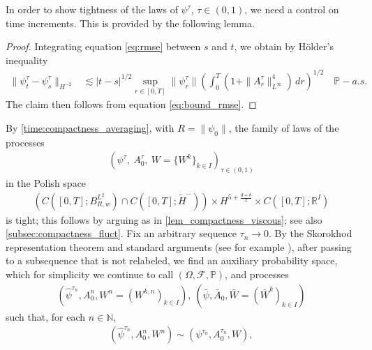 \documentclass[a4paper,10pt]{amsart}
\newcommand{\N}{\mathbb{N}}
\newtheorem{lemma}[theorem]{Lemma}
\theoremstyle{remark}
\numberwithin{equation}{section}
\begin{document}
In order to show tightness of the laws of $\psi^{\tau}$, $\tau\in (0,1)$, we need a control on time increments. This is provided by the following lemma.
\begin{proof}
    Integrating equation \eqref{eq:rmse} between $s$ and $t$, we obtain by
    H\"older's inequality
    \begin{align*}
        \|\psi^{\tau}_t-\psi^{\tau}_s\|_{H^{-2}}
        &\lesssim |t-s|^{1/2}
        \sup_{r\in[0,T]}\|\psi^{\tau}_r\|\left(\int_0^T
        (1+\|A^{\tau}_r\|^4_{L^\infty})\,dr\right)^{1/2}
        \quad\mathbb{P}-a.s.
    \end{align*}
    The claim then follows from equation \eqref{eq:bound_rmse}.
\end{proof}
By \cref{time:compactness_averaging}, with $R=\|\psi_0\|$, the family of
laws of the processes
\begin{align*}
    \left(\psi^{\tau},\ A_0^\tau,\ W=\{W^k\}_{k\in I}\right)_{\tau\in (0,1)}
\end{align*}
in the Polish space
\begin{align*}
\left(C([0,T];B^{L^2}_{R,w})\cap C([0,T];\tilde{H}^-)\right)
\times H^{5+\frac{d+\theta}{2}}\times C([0,T];\mathbb{R}^I)
\end{align*}
is tight; this follows by arguing as in \cref{lem_compactness_viscous}; see
also
\cref{subsec:compactness_fluct}. Fix an arbitrary sequence
$\tau_n\rightarrow0$. By the Skorokhod representation theorem and standard
arguments (see for example \cite[Chapter 2]{flandoli2023stochastic}), after
passing to a subsequence that is not relabeled, we find an auxiliary
probability space, which for simplicity we continue to call
$(\Omega,\mathcal{F},\mathbb{P})$, and processes
\begin{align*}
(\hat{\psi}^{\tau_n}, {A}^{n}_0,W^n=(W^{k,n})_{k\in I}),\ ( \bar{\psi} ,\bar{A}_0,\bar{W}=(\bar{W}^{k})_{k\in I})
\end{align*}
such that, for each $n\in\N$,
\begin{align*}
(\hat{\psi}^{\tau_n}, {A}^{n}_0,W^n)\sim \left({\psi}^{\tau_n}, A^{\tau_n}_0,W\right),\end{align*}
\end{document}
